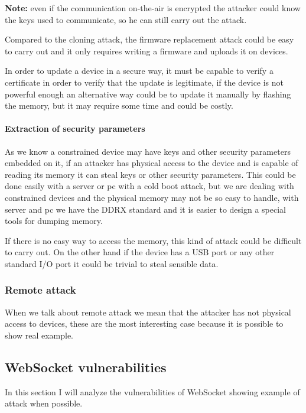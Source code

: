	\textbf{Note:} even if the communication on-the-air is encrypted the attacker could know the keys used to communicate, so he can still carry out the attack.\newline
	
	Compared to the cloning attack, the firmware replacement attack could be easy to carry out and it only requires writing a firmware and uploads it on devices.\newline
	
	In order to update a device in a secure way, it must be capable to verify a certificate in order to verify that the update is legitimate, if the device is not powerful enough an alternative way could be to update it manually by flashing the memory, but it may require some time and could be costly.\newline
	
	\paragraph{Extraction of security parameters}
	As we know a constrained device may have keys and other security parameters embedded on it, if an attacker has physical access to the device and is capable of reading its memory it can steal keys or other security parameters.\newline
	This could be done easily with a server or pc with a cold boot attack, but we are dealing with constrained devices and the physical memory may not be so easy to handle, with server and pc we have the DDRX standard and it is easier to design a special tools for dumping memory.\newline
	
	If there is no easy way to access the memory, this kind of attack could be difficult to carry out.
	On the other hand if the device has a USB port or any other standard I/O port it could be trivial to steal sensible data.
	
	
	\subsubsection{Remote attack}
	When we talk about remote attack we mean that the attacker has not physical access to devices, these are the most interesting case because it is possible to show real example.
	
	
	\subsection{WebSocket vulnerabilities}
	In this section I will analyze the vulnerabilities of WebSocket showing example of attack when possible.
	
